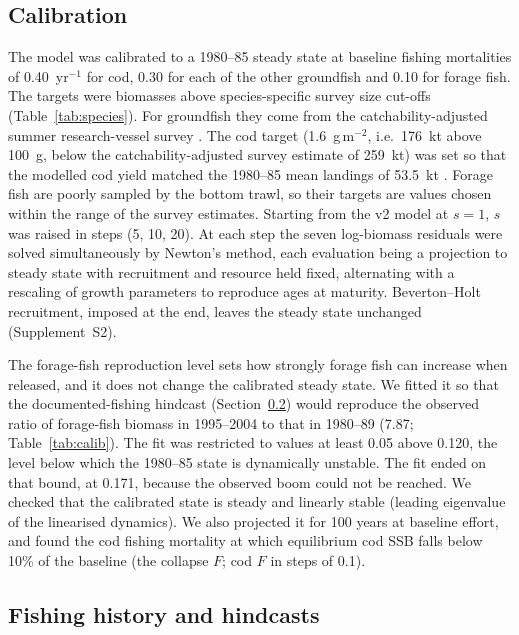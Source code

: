 \documentclass[12pt,letterpaper,fleqn]{article}
\newcommand{\yr}{yr$^{-1}$}
\newcommand{\gm}{g\,m$^{-2}$}
\begin{document}
\subsection{Calibration}\label{sec:calib}

The model was calibrated to a 1980--85 steady state at baseline fishing mortalities of 0.40~\yr{} for cod, 0.30 for each of the other groundfish and 0.10 for forage fish. The targets were biomasses above species-specific survey size cut-offs (Table~\ref{tab:species}). For groundfish they come from the catchability-adjusted summer research-vessel survey \autocite{adekoya2026code}. The cod target (1.6~\gm{}, i.e.\ 176~kt above 100~g, below the catchability-adjusted survey estimate of 259~kt) was set so that the modelled cod yield matched the 1980--85 mean landings of 53.5~kt \autocite{fanning2003assessment}. Forage fish are poorly sampled by the bottom trawl, so their targets are values chosen within the range of the survey estimates. Starting from the v2 model at $s=1$, $s$ was raised in steps (5, 10, 20). At each step the seven log-biomass residuals were solved simultaneously by Newton's method, each evaluation being a projection to steady state with recruitment and resource held fixed, alternating with a rescaling of growth parameters to reproduce ages at maturity. Beverton--Holt recruitment, imposed at the end, leaves the steady state unchanged (Supplement~S2).

The forage-fish reproduction level sets how strongly forage fish can increase when released, and it does not change the calibrated steady state. We fitted it so that the documented-fishing hindcast (Section~\ref{sec:hindcast}) would reproduce the observed ratio of forage-fish biomass in 1995--2004 to that in 1980--89 (7.87; Table~\ref{tab:calib}). The fit was restricted to values at least 0.05 above 0.120, the level below which the 1980--85 state is dynamically unstable. The fit ended on that bound, at 0.171, because the observed boom could not be reached. We checked that the calibrated state is steady and linearly stable (leading eigenvalue of the linearised dynamics). We also projected it for 100 years at baseline effort, and found the cod fishing mortality at which equilibrium cod SSB falls below 10\% of the baseline (the collapse $F$; cod $F$ in steps of 0.1).

\subsection{Fishing history and hindcasts}\label{sec:hindcast}
\end{document}
